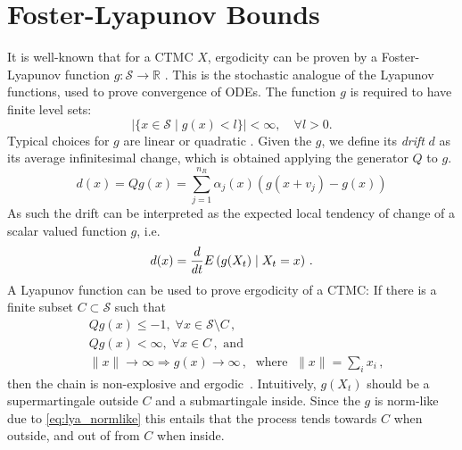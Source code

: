 \section{Foster-Lyapunov Bounds}\label{sec:statagg:lyapunov}
It is well-known that for a \ac{CTMC} $X$, ergodicity can be proven by a Foster-Lyapunov
 function $g:\mathcal{S}\to\mathbb{R}$ \parencite{meyn1993stability,dayar2011bounding}.
 This is the stochastic analogue of the Lyapunov functions, used to prove convergence of \acp{ODE}\@.
The function $g$ is required to have finite level sets:
\[
    \left|\{x\in\mathcal{S} \mid g(x) < l\}\right|<\infty,\quad \forall l > 0.
\]
Typical choices for $g$ are linear \parencite{gupta2014scalable,milias2014optimization} or quadratic \parencite{spieler2014numerical}.
Given the $g$, we define its \emph{drift} $d$ as its average infinitesimal change, which is obtained applying the generator $Q$ to $g$.%
\begin{equation}\label{eq:drift}
    d(x) = Qg(x) = \sum_{j=1}^{n_R} \alpha_j(x) (g(x+v_j) -  g(x))
\end{equation}
As such the drift can be interpreted as the expected local tendency of change of a scalar valued function $g$, i.e.\
\[
    d(x) = \frac{d}{dt}{E}\left(g(X_t)\mid X_t = x\right)\,.
\]
A Lyapunov function can be used to prove ergodicity of a \ac{CTMC}: If there is a finite subset $C\subset\mathcal{S}$ such that
\begin{align}
    &Qg(x)\leq -1,\; \forall x\in\mathcal{S}\setminus C\,,\label{eq:neg_outside}\\
    &Qg(x)< \infty,\; \forall x\in C\,, \text{ and}\label{eq:pos_inside}\\
    &\lVert x\rVert\to\infty \Rightarrow g(x)\to\infty\,,\;\text{ where }\;\lVert x\rVert=\sum_i x_i\,,\label{eq:lya_normlike}
\end{align}
then the chain is non-explosive and ergodic~\parencite{milias2014optimization,tweedie_1975}.
Intuitively, $g(X_t)$ should be a supermartingale outside $C$ and a submartingale inside.
Since the $g$ is norm-like due to \eqref{eq:lya_normlike} this entails that the process
tends towards $C$ when outside, and out of from $C$ when inside.


